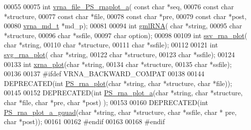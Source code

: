\begin{DoxyCode}
00055 
00075 \textcolor{keywordtype}{int} \hyperlink{plot__structure_8h_a139a31dd0ba9fc6612431f67de901c31}{vrna\_file\_PS\_rnaplot\_a}( \textcolor{keyword}{const} \textcolor{keywordtype}{char} *seq,
00076                             \textcolor{keyword}{const} \textcolor{keywordtype}{char} *structure,
00077                             \textcolor{keyword}{const} \textcolor{keywordtype}{char} *file,
00078                             \textcolor{keyword}{const} \textcolor{keywordtype}{char} *pre,
00079                             \textcolor{keyword}{const} \textcolor{keywordtype}{char} *post,
00080                             \hyperlink{group__model__details_structvrna__md__s}{vrna\_md\_t}  *md\_p);
00081 
00094 \textcolor{keywordtype}{int} \hyperlink{plot__structure_8h_a70834bc8c0aad4fe6824ff76ccb8f329}{gmlRNA}( \textcolor{keywordtype}{char} *\textcolor{keywordtype}{string},
00095             \textcolor{keywordtype}{char} *structure,
00096             \textcolor{keywordtype}{char} *ssfile,
00097             \textcolor{keywordtype}{char} option);
00098 
00109 \textcolor{keywordtype}{int} \hyperlink{plot__structure_8h_add368528755f9a830727b680243541df}{ssv\_rna\_plot}( \textcolor{keywordtype}{char} *\textcolor{keywordtype}{string},
00110                   \textcolor{keywordtype}{char} *structure,
00111                   \textcolor{keywordtype}{char} *ssfile);
00112 
00121 \textcolor{keywordtype}{int} \hyperlink{plot__structure_8h_ae7853539b5df98f294b4af434e979304}{svg\_rna\_plot}( \textcolor{keywordtype}{char} *\textcolor{keywordtype}{string},
00122                   \textcolor{keywordtype}{char} *structure,
00123                   \textcolor{keywordtype}{char} *ssfile);
00124 
00133 \textcolor{keywordtype}{int} \hyperlink{plot__structure_8h_a2f6d5953e6a323df898896b8d6614483}{xrna\_plot}(\textcolor{keywordtype}{char} *\textcolor{keywordtype}{string},
00134               \textcolor{keywordtype}{char} *structure,
00135               \textcolor{keywordtype}{char} *ssfile);
00136 
00137 \textcolor{preprocessor}{#ifdef VRNA\_BACKWARD\_COMPAT}
00138 
00144 DEPRECATED(\textcolor{keywordtype}{int} \hyperlink{plot__structure_8h_a0873c7cc4cd7a11c9a2cea19dde7e9c9}{PS\_rna\_plot}(\textcolor{keywordtype}{char} *\textcolor{keywordtype}{string}, \textcolor{keywordtype}{char} *structure, \textcolor{keywordtype}{char} *file));
00145 
00152 DEPRECATED(\textcolor{keywordtype}{int} \hyperlink{plot__structure_8h_a47856b2504b566588785597b6ebb8271}{PS\_rna\_plot\_a}(\textcolor{keywordtype}{char} *\textcolor{keywordtype}{string}, \textcolor{keywordtype}{char} *structure, \textcolor{keywordtype}{char} *file, \textcolor{keywordtype}{char} *pre, \textcolor{keywordtype}{char} *post)
      );
00153 
00160 DEPRECATED(\textcolor{keywordtype}{int} \hyperlink{plot__structure_8h_a32fa0f97625119e9d24dd2e7153abc4f}{PS\_rna\_plot\_a\_gquad}(\textcolor{keywordtype}{char} *\textcolor{keywordtype}{string}, \textcolor{keywordtype}{char} *structure, \textcolor{keywordtype}{char} *ssfile, \textcolor{keywordtype}{char} *
      pre, \textcolor{keywordtype}{char} *post));
00161 
00162 \textcolor{preprocessor}{#endif}
00163 
00168 \textcolor{preprocessor}{#endif}
\end{DoxyCode}
